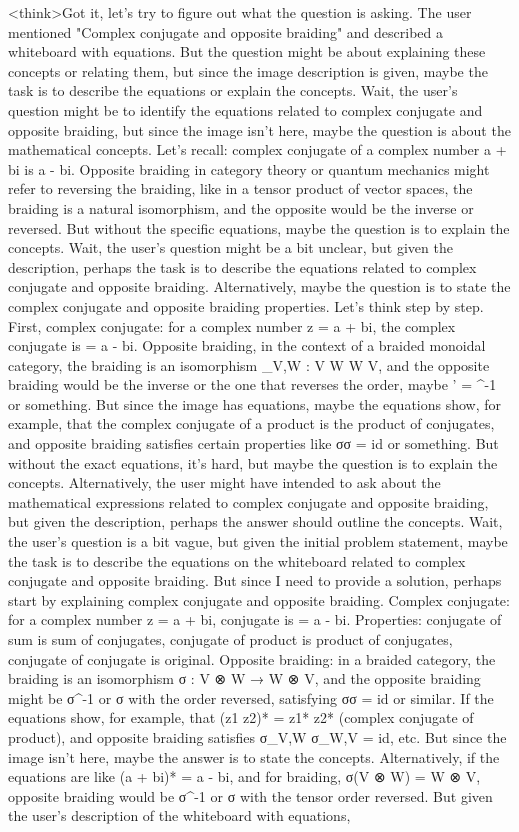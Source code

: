 <think>Got it, let's try to figure out what the question is asking. The user mentioned "Complex conjugate and opposite braiding" and described a whiteboard with equations. But the question might be about explaining these concepts or relating them, but since the image description is given, maybe the task is to describe the equations or explain the concepts. Wait, the user's question might be to identify the equations related to complex conjugate and opposite braiding, but since the image isn't here, maybe the question is about the mathematical concepts. Let's recall: complex conjugate of a complex number a + bi is a - bi. Opposite braiding in category theory or quantum mechanics might refer to reversing the braiding, like in a tensor product of vector spaces, the braiding is a natural isomorphism, and the opposite would be the inverse or reversed. But without the specific equations, maybe the question is to explain the concepts. Wait, the user's question might be a bit unclear, but given the description, perhaps the task is to describe the equations related to complex conjugate and opposite braiding. Alternatively, maybe the question is to state the complex conjugate and opposite braiding properties. Let's think step by step. First, complex conjugate: for a complex number z = a + bi, the complex conjugate is  = a - bi. Opposite braiding, in the context of a braided monoidal category, the braiding is an isomorphism \sigma_{V,W} : V \otimes W \to W \otimes V, and the opposite braiding would be the inverse or the one that reverses the order, maybe \sigma' = \sigma^{-1} or something. But since the image has equations, maybe the equations show, for example, that the complex conjugate of a product is the product of conjugates, and opposite braiding satisfies certain properties like σσ = id or something. But without the exact equations, it's hard, but maybe the question is to explain the concepts. Alternatively, the user might have intended to ask about the mathematical expressions related to complex conjugate and opposite braiding, but given the description, perhaps the answer should outline the concepts. Wait, the user's question is a bit vague, but given the initial problem statement, maybe the task is to describe the equations on the whiteboard related to complex conjugate and opposite braiding. But since I need to provide a solution, perhaps start by explaining complex conjugate and opposite braiding. Complex conjugate: for a complex number z = a + bi, conjugate is  = a - bi. Properties: conjugate of sum is sum of conjugates, conjugate of product is product of conjugates, conjugate of conjugate is original. Opposite braiding: in a braided category, the braiding is an isomorphism σ : V ⊗ W → W ⊗ V, and the opposite braiding might be σ^{-1} or σ with the order reversed, satisfying σσ = id or similar. If the equations show, for example, that (z1 z2)* = z1* z2* (complex conjugate of product), and opposite braiding satisfies σ_{V,W} σ_{W,V} = id, etc. But since the image isn't here, maybe the answer is to state the concepts. Alternatively, if the equations are like (a + bi)* = a - bi, and for braiding, σ(V ⊗ W) = W ⊗ V, opposite braiding would be σ^{-1} or σ with the tensor order reversed. But given the user's description of the whiteboard with equations, 